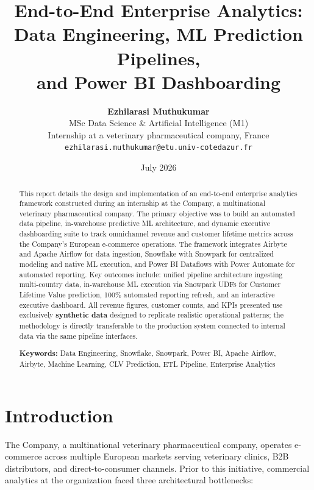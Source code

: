 \documentclass[11pt,a4paper]{article}
\title{\vspace{-1.5cm}\textbf{End-to-End Enterprise Analytics:\\Data Engineering, ML Prediction Pipelines,\\and Power BI Dashboarding}\vspace{-0.3cm}}
\author{
    \textbf{Ezhilarasi Muthukumar}\\
    \small MSc Data Science \& Artificial Intelligence (M1)\\
    \small Internship at a veterinary pharmaceutical company, France\\
    \small \texttt{ezhilarasi.muthukumar@etu.univ-cotedazur.fr}
}
\date{\small July 2026}
\begin{document}
\maketitle
\thispagestyle{fancy}

\begin{abstract}
\noindent This report details the design and implementation of an end-to-end enterprise analytics framework constructed during an internship at the Company, a multinational veterinary pharmaceutical company. The primary objective was to build an automated data pipeline, in-warehouse predictive ML architecture, and dynamic executive dashboarding suite to track omnichannel revenue and customer lifetime metrics across the Company's European e-commerce operations. The framework integrates Airbyte and Apache Airflow for data ingestion, Snowflake with Snowpark for centralized modeling and native ML execution, and Power BI Dataflows with Power Automate for automated reporting. Key outcomes include: unified pipeline architecture ingesting multi-country data, in-warehouse ML execution via Snowpark UDFs for Customer Lifetime Value prediction, 100\% automated reporting refresh, and an interactive executive dashboard. All revenue figures, customer counts, and KPIs presented use exclusively \textbf{synthetic data} designed to replicate realistic operational patterns; the methodology is directly transferable to the production system connected to internal data via the same pipeline interfaces.

\medskip
\noindent\textbf{Keywords:} Data Engineering, Snowflake, Snowpark, Power BI, Apache Airflow, Airbyte, Machine Learning, CLV Prediction, ETL Pipeline, Enterprise Analytics
\end{abstract}

\section{Introduction}

The Company, a multinational veterinary pharmaceutical company, operates e-commerce across multiple European markets serving veterinary clinics, B2B distributors, and direct-to-consumer channels. Prior to this initiative, commercial analytics at the organization faced three architectural bottlenecks:
\end{document}
